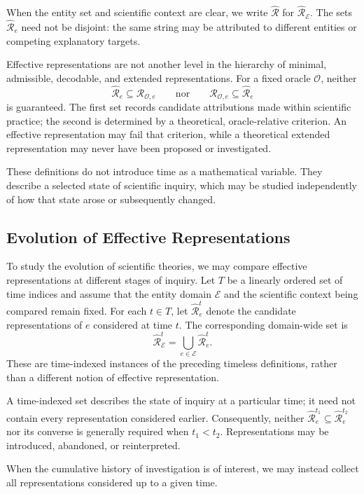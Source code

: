 When the entity set and scientific context are clear, we write $\hat{\mathcal R}$ for $\hat{\mathcal R}_{\mathcal E}$. The sets $\hat{\mathcal R}_e$ need not be disjoint: the same string may be attributed to different entities or competing explanatory targets.

Effective representations are not another level in the hierarchy of minimal, admissible, decodable, and extended representations. For a fixed oracle $\mathcal O$, neither
\[
\hat{\mathcal R}_e\subseteq\mathcal R_{\mathcal O,e}
\qquad\text{nor}\qquad
\mathcal R_{\mathcal O,e}\subseteq\hat{\mathcal R}_e
\]
is guaranteed. The first set records candidate attributions made within scientific practice; the second is determined by a theoretical, oracle-relative criterion. An effective representation may fail that criterion, while a theoretical extended representation may never have been proposed or investigated.

These definitions do not introduce time as a mathematical variable. They describe a selected state of scientific inquiry, which may be studied independently of how that state arose or subsequently changed.

\subsection*{Evolution of Effective Representations}

To study the evolution of scientific theories, we may compare effective representations at different stages of inquiry. Let $T$ be a linearly ordered set of time indices and assume that the entity domain $\mathcal E$ and the scientific context being compared remain fixed. For each $t\in T$, let $\hat{\mathcal R}_e^t$ denote the candidate representations of $e$ considered at time $t$. The corresponding domain-wide set is
\[
\hat{\mathcal R}_{\mathcal E}^t
=\bigcup_{e\in\mathcal E}\hat{\mathcal R}_e^t.
\]
These are time-indexed instances of the preceding timeless definitions, rather than a different notion of effective representation.

A time-indexed set describes the state of inquiry at a particular time; it need not contain every representation considered earlier. Consequently, neither $\hat{\mathcal R}_e^{t_1}\subseteq\hat{\mathcal R}_e^{t_2}$ nor its converse is generally required when $t_1<t_2$. Representations may be introduced, abandoned, or reinterpreted.

When the cumulative history of investigation is of interest, we may instead collect all representations considered up to a given time.

